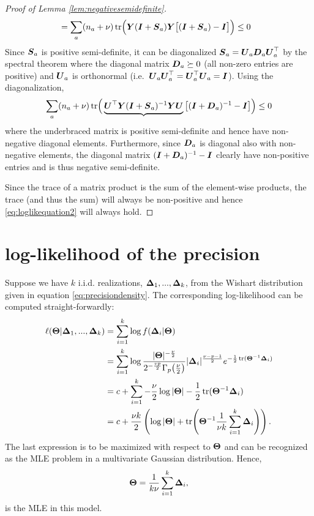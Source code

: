 \documentclass{article}\usepackage[]{graphicx}\usepackage[]{color}
\begin{document}
\begin{proof}[Proof of Lemma \ref{lem:negativesemidefinite}]
\begin{align*}
  &=  \sum_a (n_a + \nu)\operatorname*{tr}\!\Big( {\boldsymbol{Y}} ({\boldsymbol{I}} + {\boldsymbol{S}}_a) {\boldsymbol{Y}} \big[ ({\boldsymbol{I}} + {\boldsymbol{S}}_a)  - {\boldsymbol{I}} \big]\Big)
  \leq 0
\end{align*}
Since ${\boldsymbol{S}}_a$ is positive semi-definite, it can be diagonalized ${\boldsymbol{S}}_a = {\boldsymbol{U}}_a {\boldsymbol{D}}_a {\boldsymbol{U}}_a^\top$ by the spectral theorem where the diagonal matrix ${\boldsymbol{D}}_a \succeq 0$ (all non-zero entries are positive) and ${\boldsymbol{U}}_a$ is orthonormal (i.e.\ ${\boldsymbol{U}}_a{\boldsymbol{U}}_a^\top = {\boldsymbol{U}}_a^\top{\boldsymbol{U}}_a = {\boldsymbol{I}}$). Using the diagonalization,
\begin{align}
  \sum_a (n_a + \nu)\operatorname*{tr}\!\Big(
    \underbrace{{\boldsymbol{U}}^\top {\boldsymbol{Y}} ({\boldsymbol{I}} + {\boldsymbol{S}}_a)^{-1} {\boldsymbol{Y}} {\boldsymbol{U}}}
    \big[ ({\boldsymbol{I}} + {\boldsymbol{D}}_a)^{-1}  - {\boldsymbol{I}} \big]
  \Big)
  \leq 0
  \label{eq:loglikequation2}
\end{align}
where the underbraced matrix is positive semi-definite and hence have non-negative diagonal elements.
Furthermore, since ${\boldsymbol{D}}_a$ is diagonal also with non-negative elements, the diagonal matrix $({\boldsymbol{I}} + {\boldsymbol{D}}_a)^{-1}  - {\boldsymbol{I}}$ clearly have non-positive entries and is thus negative semi-definite.

Since the trace of a matrix product is the sum of the element-wise products, the trace (and thus the sum) will always be non-positive and hence \eqref{eq:loglikequation2} will always hold.
\end{proof}



\section{log-likelihood of the precision}
\label{sec:precisionloglik}
Suppose we have $k$ i.i.d. realizations, ${\boldsymbol{\Delta}}_1, ..., {\boldsymbol{\Delta}}_k$, from the Wishart distribution given in equation \eqref{eq:precisiondensity}. The corresponding log-likelihood can be computed straight-forwardly:
\begin{align*}
  \ell({\boldsymbol{\Theta}} | {\boldsymbol{\Delta}}_1, ..., {\boldsymbol{\Delta}}_k)
  &= \sum_{i = 1}^k \log f({\boldsymbol{\Delta}}_i | {\boldsymbol{\Theta}}) \\
  &= \sum_{i = 1}^k \log
    \frac{|{\boldsymbol{\Theta}}|^{-\frac{\nu}{2}}}{
      2^{-\frac{vp}{2}}
      \Gamma_p\!\left(\frac{\nu}{2}\right)}
    |{\boldsymbol{\Delta}}_i|^\frac{\nu - p - 1}{2}e^{-\frac{1}{2}\operatorname*{tr}({\boldsymbol{\Theta}}^{-1}{\boldsymbol{\Delta}}_i)}\\
   &= c + \sum_{i = 1}^k
     -\frac{\nu}{2} \log |{\boldsymbol{\Theta}}|
     -\frac{1}{2}\operatorname*{tr}({\boldsymbol{\Theta}}^{-1}{\boldsymbol{\Delta}}_i) \\
   &= c + \frac{\nu k}{2}
     \left(
       \log |{\boldsymbol{\Theta}}| +
       \operatorname*{tr}\!\left({\boldsymbol{\Theta}}^{-1} \frac{1}{\nu k}\sum_{i = 1}^k{\boldsymbol{\Delta}}_i\right)
     \right).
\end{align*}
The last expression is to be maximized with respect to ${\boldsymbol{\Theta}}$ and can be recognized as the MLE problem in a multivariate Gaussian distribution. Hence,
\begin{align*}
  {\boldsymbol{\Theta}} = \frac{1}{k \nu} \sum_{i = 1}^k {\boldsymbol{\Delta}}_i,
\end{align*}
is the MLE in this model.
\end{document}

